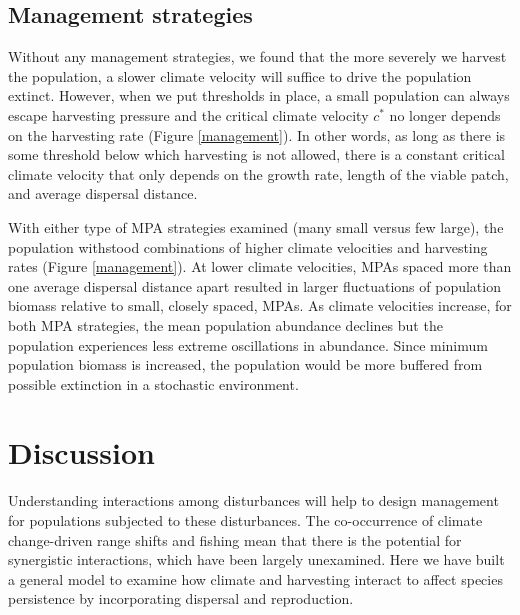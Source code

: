 \documentclass[12pt,english]{article}
\begin{document}
\begin{spacing}{1.9}
\begin{flushleft}
\subsection{Management strategies }

Without any management strategies, we found that the more severely we harvest the population, a slower climate velocity will suffice to drive the population extinct. However, when we put thresholds in place, a small population can always escape harvesting pressure and the critical climate velocity $c^*$ no longer depends on the harvesting rate (Figure \ref{management}). In other words, as long as there is some threshold below which harvesting is not allowed, there is a constant critical climate velocity that only depends on the growth rate, length of the viable patch, and average dispersal distance.  

With either type of MPA strategies examined (many small versus few large), the population withstood combinations of higher climate velocities and harvesting rates (Figure \ref{management}).  At lower climate velocities, MPAs spaced more than one average dispersal distance apart resulted in larger fluctuations of population biomass relative to small, closely spaced, MPAs.  As climate velocities increase, for both MPA strategies, the mean population abundance declines but the population experiences less extreme oscillations in abundance.  Since minimum population biomass is increased, the population would be more buffered from possible extinction in a stochastic environment. %

\section{Discussion}

Understanding interactions among disturbances will help to design management for populations subjected to these disturbances. The co-occurrence of climate change-driven range shifts and fishing mean that there is the potential for synergistic interactions, which have been largely unexamined.  Here we have built a general model to examine how climate and harvesting interact to affect species persistence by incorporating dispersal and reproduction. 


\end{flushleft}
\end{spacing}
\end{document}
